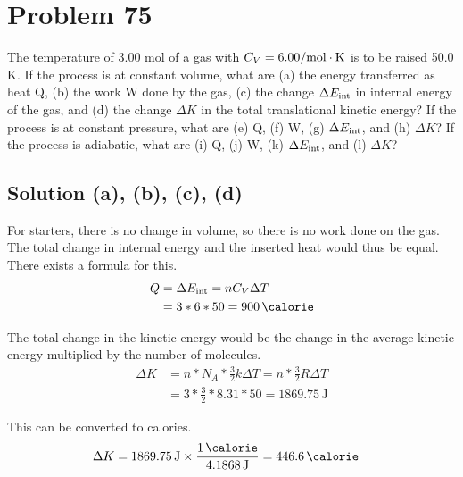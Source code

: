 \documentclass[12pt]{article}
\begin{document}


    \pagebreak
    \section{Problem 75}
        The temperature of 3.00 mol of a gas with $C_V = 6.00 \unit{\cal/\mole\cdot\kelvin}$ is to be raised 50.0 K. 
        If the process is at constant volume, what are (a) the energy transferred as heat Q, (b) the work W done by the gas, (c) the change $\Delta E_{\rm int}$ in internal energy of the gas, and (d) the change $\Delta K$ in the total translational kinetic energy? 
        If the process is at constant pressure, what are (e) Q, (f) W, (g) $\Delta E_{\rm int}$, and (h) $\Delta K$? 
        If the process is adiabatic, what are (i) Q, (j) W, (k) $\Delta E_{\rm int}$, and (l) $\Delta K$?

        \subsection{Solution (a), (b), (c), (d)}
            For starters, there is no change in volume, so there is no work done on the gas.
            The total change in internal energy and the inserted heat would thus be equal.
            There exists a formula for this.
            \begin{align}
                Q   &=  \Delta E_{\rm int}
                    =   n C_V \Delta T\\
                    &=  3 * 6 * 50
                    =   900\,\unit{\calorie}
            \end{align}

            The total change in the kinetic energy would be the change in the average kinetic energy multiplied by the number of molecules.
            \begin{align}
                \Delta K    &=  n * N_A * \frac{3}{2}k \Delta T
                    =   n * \frac{3}{2}R \Delta T\\
                    &=  3 * \frac{3}{2} * 8.31 * 50
                    =   1869.75\,\unit{\joule}
            \end{align}

            This can be converted to calories.
            \begin{align}
                \Delta K    &=  1869.75\,\unit{\joule} \times \frac{1\,\unit{\calorie}}{4.1868\,\unit{\joule}}
                    =   446.6\,\unit{\calorie}
            \end{align}
\end{document}
